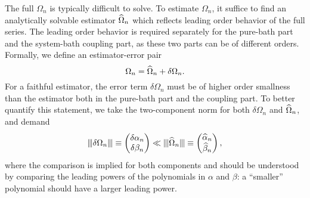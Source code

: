 \documentclass[b5paper,11pt]{article}
\begin{document}
The full $\Omega_{n}$ is typically difficult to solve.
To estimate $\Omega_{n}$, it suffice to find an analytically solvable estimator $\widehat{\Omega}_{n}$ which reflects leading order behavior of the full series. 
The leading order behavior is required separately for the pure-bath part and the system-bath coupling part, as these two parts can be of different orders. 
Formally, we define an estimator-error pair 
\begin{equation}
 \Omega_{n} = \widehat{\Omega}_{n} + \delta\Omega_{n}.
\end{equation}
For a faithful estimator, the error term $ \delta\Omega_{n}$ must be of higher order smallness than the estimator both in the pure-bath part and the coupling part. To better quantify this statement, we take the two-component norm for both 
$\delta\Omega_{n}$ and $\widehat{\Omega}_{n}$, and demand
\begin{equation}\label{eq:tcn-esterr}
\opnorm{\delta\Omega_{n}}\equiv
\begin{pmatrix}
\delta\alpha_{n}\\
\delta\beta_{n}
\end{pmatrix}
\ll 
\opnorm{\Ohat_{n}}\equiv\begin{pmatrix}
\widehat\alpha_{n}\\
\widehat\beta_{n}
\end{pmatrix},
\end{equation}
where the comparison is implied for both components and should be understood by comparing the leading powers of the polynomials in $\alpha$ and $\beta$:
a ``smaller'' polynomial should have a larger leading power. 


\end{document}
